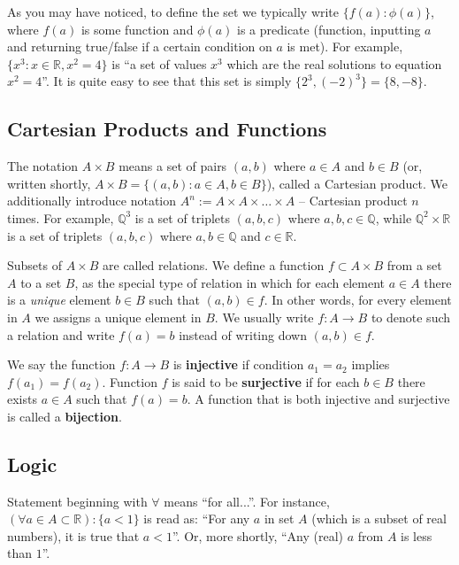 \documentclass[../lecture-notes-148x210.tex]{subfiles}
\begin{document}
As you may have noticed, to define the set we typically write $\{f(a): \phi(a)\}$, where $f(a)$ is some 
function and $\phi(a)$ is a predicate (function, inputting $a$ and returning true/false if a certain condition 
on $a$ is met). For example, $\{x^3: x \in \mathbb{R}, x^2 = 4\}$ is ``a set of values $x^3$ which are the real 
solutions to equation $x^2 = 4$''. It is quite easy to see that this set is simply $\{2^3, (-2)^3\} = \{8,-8\}$. 

\subsection*{Cartesian Products and Functions}

The notation $A \times B$ means a set of pairs $(a,b)$ where $a \in A$ and $b \in B$ (or, written shortly, 
$A \times B = \{(a,b): a \in A, b \in B\}$), called a Cartesian product. We additionally introduce notation 
$A^n := A \times A \times \dots \times A$ -- Cartesian product $n$ times. For example, $\mathbb{Q}^3$ is a set of triplets 
$(a,b,c)$ where $a,b,c \in \mathbb{Q}$, while $\mathbb{Q}^2 \times \mathbb{R}$ is a set of triplets $(a,b,c)$ where 
$a,b \in \mathbb{Q}$ and $c \in \mathbb{R}$.

Subsets of $ A \times B$ are called relations. We define a function $f \subset A
\times B$ from a set $A$ to a set $B$, as the special type of relation in which
for each element $a \in A$ there is a \textit{unique} element $b \in B$ such
that $(a, b) \in f$. In other words, for every element in $A$ we assigns a
unique element in $B$. We usually write $f : A \to B$ to denote such a relation
and write $f(a) = b$ instead of writing down $(a,b) \in f$.

We say the function $f : A \to B$ is \textbf{injective} if condition $a_1 = a_2$
implies $f(a_1) = f(a_2)$. Function $f$ is said to be \textbf{surjective} if for
each $b \in B$ there exists $a \in A$ such that $f(a) = b$. A function that is
both injective and surjective is called a \textbf{bijection}.


\subsection*{Logic}

Statement beginning with $\forall$ means ``for all...''. For instance, $(\forall a \in A \subset \mathbb{R}): \{a < 1\}$ is 
read as: ``For any $a$ in set $A$ (which is a subset of real numbers), it is true that $a<1$''. Or, more shortly, ``Any (real) 
$a$ from $A$ is less than $1$''.
\end{document}

